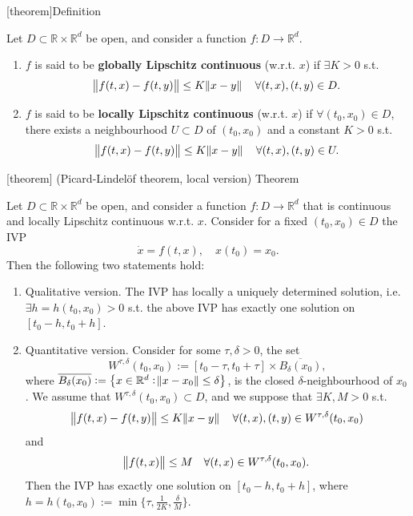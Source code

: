 \documentclass[12pt]{report}
\theoremstyle{definition}
\begin{document}
[theorem]{Definition}
\begin{Global and local Lipschitz continuity}
    Let $D\subset \mathbb{R}\times\mathbb{R}^{d}$ be open, and consider a
    function $f:D\rightarrow\mathbb{R}^{d}$.
    \begin{enumerate}[label = (\roman*)]
        \item $f$ is said to be \textbf{globally Lipschitz continuous} 
            (w.r.t. $x$) if $\exists K>0$ s.t.
            \[
                \norm{f(t,x)-f(t,y)}\le K\norm{x-y} 
                \quad \forall (t,x), (t,y)\in D.
            \]
        \item $f$ is said to be \textbf{locally Lipschitz continuous}
            (w.r.t. $x$) if $\forall (t_0, x_0)\in D$,
            there exists a neighbourhood $U\subset D$ of $(t_0, x_0)$
            and a constant $K>0$ s.t.
            \[
                \norm{f(t,x)-f(t,y)}\le K\norm{x-y}
                \quad\forall (t,x),(t,y)\in U.
            \]
    \end{enumerate} 
\end{Global and local Lipschitz continuity}

[theorem]
{(Picard-Lindel\"{o}f theorem, local version) Theorem}
\begin{Picard-Lindelof theorem, local version}
    Let $D\subset \mathbb{R}\times\mathbb{R}^{d}$ be open, and consider a
    function $f:D\rightarrow\mathbb{R}^{d}$ that is continuous and locally
    Lipschitz continuous w.r.t. $x$. Consider for a fixed $(t_0,x_0)\in D$
    the IVP
    \[
        \dot{x}=f(t,x), \quad x(t_0)=x_0.
    \]
    Then the following two statements hold:
    \begin{enumerate}[label = (\roman*)]
        \item Qualitative version.
            The IVP has locally a uniquely determined solution, i.e.\ $\exists h
            = h(t_0,x_0)>0$ s.t. the above IVP has exactly one solution on 
            $[t_0-h,t_0+h]$.
        \item Quantitative version.
            Consider for some $\tau,\delta>0$, the set
            \[
                W^{\tau,\delta}(t_0,x_0):=[t_0-\tau,t_0+\tau]\times
                \overline{B_\delta(x_0)},
            \]
            where $\overline{B_\delta(x_0)}
            := \left\{x\in\mathbb{R}^{d}:\norm{x-x_0}\le\delta\right\}$,
            is the closed $\delta$-neighbourhood of $x_0$.
            We assume that $W^{\tau, \delta}(t_0,x_0)\subset D$,
            and we suppose that $\exists K,M>0$ s.t.
            \[
                \norm{f(t,x)-f(t,y)}\le K\norm{x-y}
                \quad\forall(t,x),(t,y)\in W^{\tau,\delta}(t_0,x_0)
            \]
            and
            \[
                \norm{f(t,x)}\le M
                \quad\forall (t,x)\in W^{\tau,\delta}(t_0, x_0).
            \]
            Then the IVP has exactly one solution on $[t_0-h,t_0+h]$,
            where $h=h(t_0,x_0):=\min\{\tau, \frac{1}{2K}, \frac{\delta}{M}\}$.
    \end{enumerate} 
\end{Picard-Lindelof theorem, local version}
\end{document}
